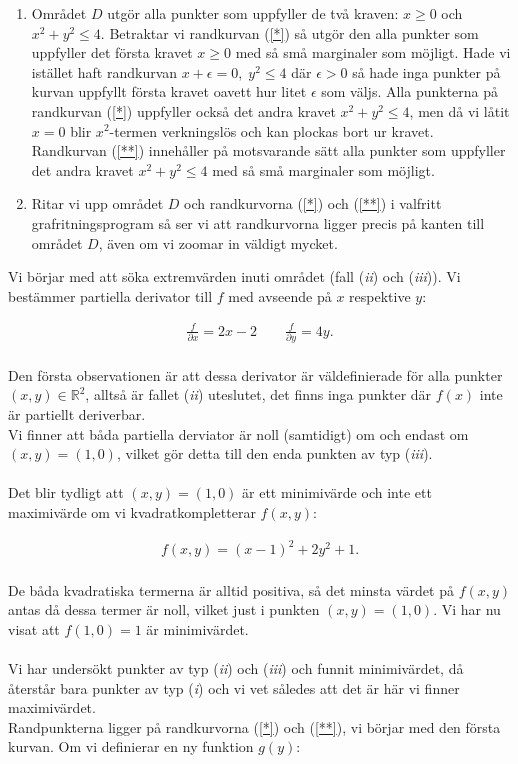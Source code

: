\documentclass{article}
\begin{document}
\begin{enumerate}
  \item Området $D$ utgör alla punkter som uppfyller de två kraven: $x \geq 0$ och $x^{2} + y^{2} \leq 4$. Betraktar vi randkurvan (\ref{*}) så utgör den alla punkter som uppfyller det första kravet $x \geq 0$ med så små marginaler som möjligt. Hade vi istället haft randkurvan $x + \epsilon = 0, \; y^{2} \leq 4$ där $\epsilon > 0$ så hade inga punkter på kurvan uppfyllt första kravet oavett hur litet $\epsilon$ som väljs. Alla punkterna på randkurvan (\ref{*}) uppfyller också det andra kravet $x^{2} + y^{2} \leq 4$, men då vi låtit $x = 0$ blir $x^{2}$-termen verkningslös och kan plockas bort ur kravet. \\
  Randkurvan (\ref{**}) innehåller på motsvarande sätt alla punkter som uppfyller det andra kravet $x^{2} + y^{2} \leq 4$ med så små marginaler som möjligt.
  \item Ritar vi upp området $D$ och randkurvorna (\ref{*}) och (\ref{**}) i valfritt grafritningsprogram så ser vi att randkurvorna ligger precis på kanten till området $D$, även om vi zoomar in väldigt mycket.
\end{enumerate}

\noindent Vi börjar med att söka extremvärden inuti området (fall (\emph{ii}) och (\emph{iii})). Vi bestämmer partiella derivator till $f$ med avseende på $x$ respektive $y$:

\begin{gather*}
  \frac{f}{\partial x} = 2x - 2 \quad\quad \frac{f}{\partial y} = 4y\text{.}
\end{gather*}
\\
Den första observationen är att dessa derivator är väldefinierade för alla punkter $(x, y) \in \mathbb{R}^{2}$, alltså är fallet (\emph{ii}) uteslutet, det finns inga punkter där $f(x)$ inte är partiellt deriverbar.
\\
Vi finner att båda partiella derviator är noll (samtidigt) om och endast om $(x, y) = (1, 0)$, vilket gör detta till den enda punkten av typ (\emph{iii}).
\\
\\
Det blir tydligt att $(x, y) = (1, 0)$ är ett minimivärde och inte ett maximivärde om vi kvadratkompletterar $f(x, y)$:

\begin{align*}
  f(x, y) = (x - 1)^{2} + 2y^2 + 1\text{.}
\end{align*}
\\
De båda kvadratiska termerna är alltid positiva, så det minsta värdet på $f(x, y)$ antas då dessa termer är noll, vilket just i punkten $(x, y) = (1, 0)$. Vi har nu visat att $f(1, 0) = 1$ är minimivärdet.
\\
\\
Vi har undersökt punkter av typ (\emph{ii}) och (\emph{iii}) och funnit minimivärdet, då återstår bara punkter av typ (\emph{i}) och vi vet således att det är här vi finner maximivärdet.
\\
Randpunkterna ligger på randkurvorna (\ref{*}) och (\ref{**}), vi börjar med den första kurvan. Om vi definierar en ny funktion $g(y)$:
\end{document}
